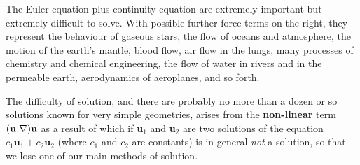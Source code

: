 \documentclass[10pt]{report}
\begin{document}
The Euler equation plus continuity equation are extremely important but
extremely difficult to solve. With possible further force terms on the
right, they represent the behaviour of gaseous stars, the flow of oceans and
atmosphere, the motion of the earth's mantle, blood flow, air flow in the
lungs, many processes of chemistry and chemical engineering, the flow of
water in rivers and in the permeable earth, aerodynamics of aeroplanes, and
so forth.

The difficulty of solution, and there are probably no more than a dozen or
so solutions known for very simple geometries, arises from the
\textbf{non-linear} term $({\bf u}. \nabla ){\bf u}$ as a result of which if
\textbf{u}$_{1}$ and \textbf{u}$_{ 2}$ are two solutions of the equation
$c_{1 }\textbf{u}_{ 1} + c_{2 }\textbf{u}_{ 2}$ (where $c_{1 }$ and
$c_{2}$ are constants) is in general \textit{not} a solution, so that we lose one of our
main methods of solution.
\end{document}
